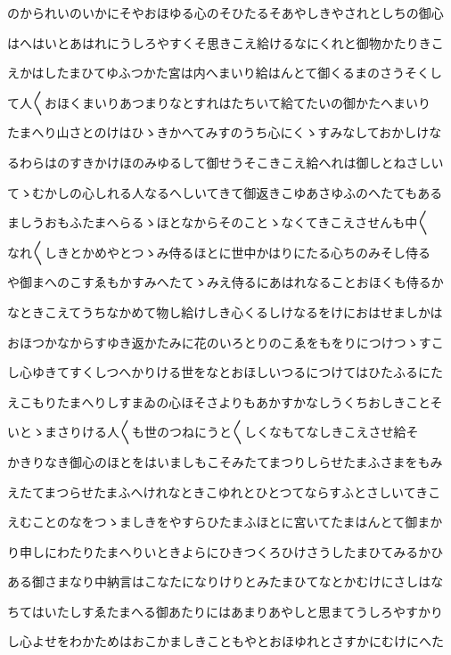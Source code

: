 \documentclass[a4paper,11pt,landscape]{ltjtarticle}
\begin{document}
のかられいのいかにそやおほゆる心のそひたるそあやしきやされとしちの御心
\par\medskip
はへはいとあはれにうしろやすくそ思きこえ給けるなにくれと御物かたりきこ
\par\medskip
えかはしたまひてゆふつかた宮は内へまいり給はんとて御くるまのさうそくし
\par\medskip
て人〱おほくまいりあつまりなとすれはたちいて給てたいの御かたへまいり
\par\medskip
たまへり山さとのけはひゝきかへてみすのうち心にくゝすみなしておかしけな
\par\medskip
るわらはのすきかけほのみゆるして御せうそこきこえ給へれは御しとねさしい
\par\medskip
てゝむかしの心しれる人なるへしいてきて御返きこゆあさゆふのへたてもある
\par\medskip
ましうおもふたまへらるゝほとなからそのことゝなくてきこえさせんも中〱
\par\medskip
なれ〱しきとかめやとつゝみ侍るほとに世中かはりにたる心ちのみそし侍る
\par\medskip
や御まへのこすゑもかすみへたてゝみえ侍るにあはれなることおほくも侍るか
\par\medskip
なときこえてうちなかめて物し給けしき心くるしけなるをけにおはせましかは
\par\medskip
おほつかなからすゆき返かたみに花のいろとりのこゑをもをりにつけつゝすこ
\par\medskip
し心ゆきてすくしつへかりける世をなとおほしいつるにつけてはひたふるにた
\par\medskip
えこもりたまへりしすまゐの心ほそさよりもあかすかなしうくちおしきことそ
\par\medskip
いとゝまさりける人〱も世のつねにうと〱しくなもてなしきこえさせ給そ
\par\medskip
かきりなき御心のほとをはいましもこそみたてまつりしらせたまふさまをもみ
\par\medskip
えたてまつらせたまふへけれなときこゆれとひとつてならすふとさしいてきこ
\par\medskip
えむことのなをつゝましきをやすらひたまふほとに宮いてたまはんとて御まか
\par\medskip
り申しにわたりたまへりいときよらにひきつくろひけさうしたまひてみるかひ
\par\medskip
ある御さまなり中納言はこなたになりけりとみたまひてなとかむけにさしはな
\par\medskip
ちてはいたしすゑたまへる御あたりにはあまりあやしと思まてうしろやすかり
\par\medskip
し心よせをわかためはおこかましきこともやとおほゆれとさすかにむけにへた
\end{document}

